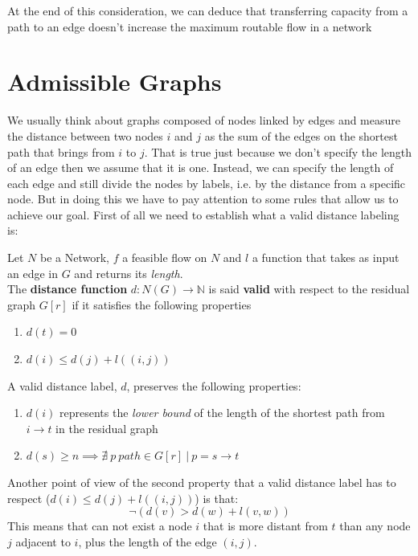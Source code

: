 At the end of this consideration, we can deduce that transferring capacity from a path to an edge doesn't increase the maximum routable flow in a network
\newpage
\section{Admissible Graphs}
We usually think about graphs composed of nodes linked by edges and measure the distance between two nodes $i$ and $j$ as the sum of the edges on the shortest path that brings from $i$ to $j$. That is true just because we don't specify the length of an edge then we assume that it is one. Instead, we can specify the length of each edge and still divide the nodes by labels, i.e. by the distance from a specific node. But in doing this we have to pay attention to some rules that allow us to achieve our goal.
First of all we need to establish what a valid distance labeling is:
\begin{definition}
    \label{VDL}
    Let $N$ be a Network, $f$ a feasible flow on $N$ and $l$ a function that takes as input an edge in $G$ and returns its \textit{length}.\\
    The \textbf{distance function} $d: N(G) \rightarrow \mathbb{N}$ is said \textbf{valid} with respect to the residual graph $G[r]$ if it satisfies the following properties 
    \begin{enumerate}
        \item $d(t) = 0$
        \item $d(i) \le d(j) + l((i,j))$
    \end{enumerate}
\end{definition}

\begin{obs}
    A valid distance label, $d$, preserves the following properties:
    \begin{enumerate}
        \item $d(i)$ represents the \textit{lower bound} of the length of the shortest path from $i \rightarrow t$
        in the residual graph
        \item $d(s) \ge n \implies \nexists\ p\ path \in G[r]\ |\ p = s \rightarrow t $ 
    \end{enumerate}
    
\end{obs}
Another point of view of the second property that a valid distance label has to respect ($d(i) \le d(j) + l((i,j))$) is that:
\[\neg (d(v) > d(w) + l(v,w))\]
This means that can not exist a node $i$ that is more distant from $t$ than any node $j$ adjacent to $i$, plus the length of the edge $(i,j)$.

